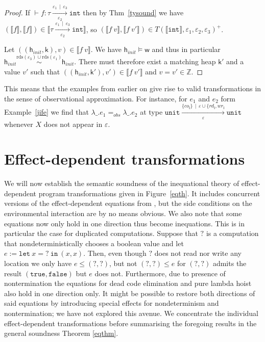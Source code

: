 \documentclass[nocopyrightspace,preprint]{sigplanconf}
\newcommand{\keywd}[1]{\mathtt{#1}}
\newcommand{\myeffto}[3]{\xrightarrow[#2]{#1\,\mid\, #3}}
\newcommand{\mnond}{\texttt{?}}
\newcommand{\mtrue}{\keywd{true}}
\newcommand{\mfalse}{\keywd{false}}
\newcommand{\inttype}{\keywd{int}}
\newcommand{\unittype}{\keywd{unit}}
\newcommand{\letin}[2]{\keywd{let}\:{#1}\!=\!{#2}\:\keywd{in}\:}
\newcommand{\rdsin}[1]{\mathrm{rds}({#1})}
\newcommand{\eff}{\varepsilon}
\newcommand{\sem}[1]{\ensuremath{\llbracket {#1} \rrbracket}}
\newcommand{\rEff}[1]{\ensuremath{\mathit{rd}_{#1}}}
\newcommand{\cEff}[1]{\ensuremath{\mathit{co}_{#1}}}
\newcommand{\wEff}[1]{\ensuremath{\mathit{wr}_{#1}}}
\newcommand{\loc}{\mathfrak{l}}
\newcommand{\cloc}{\ensuremath{X}\xspace}
\newcommand\w{\ensuremath{\mathsf{w}}\xspace}
\newcommand\hinit{\ensuremath{\mathsf{h}_{\mathit{init}}}\xspace}
\renewcommand\k{\ensuremath{\mathsf{k}}\xspace}
\newcommand\rloc[3]{\ensuremath{#1 \stackrel{#3}{\sim} #2}}
\begin{document}
\begin{proof}
If $\vdash f:\tau\myeffto{\eff_1}{\eff_2}{\eff_3}\inttype$ then by Thm~\ref{tysound} we have $(\sem{f},\sem{f})\in \sem{\tau\myeffto{\eff_1}{\eff_2}{\eff_3} \inttype}$, so 
$(\sem{f\ v},\sem{f\ v'})\in T(\sem{\inttype},\eff_1,\eff_2,\eff_3)^+$. 

Let $((\hinit,\k),v)\in \sem{f\ v}$. We have $\hinit\models\w$ and
thus in particular
$\rloc{\hinit}{\hinit}{\rdsin{\eff_3}\cup\rdsin{\eff_1}}$. There must
therefore exist a matching heap $\k'$ and a value $v'$ such that
$((\hinit,\k'),v')\in \sem{f\ v'}$ and $v=v'\in\mathbb{Z}$.
\end{proof}
This means that the examples from earlier on give rise to valid transformations in the sense of observational approximation. For instance, for $e_1$ and $e_2$ form Example~\ref{jife} we find that 
$\lambda \_.e_1 =_{\mathit{obs}}  \lambda\_.e_2$ at type $\unittype\myeffto{\{\cEff{\loc}\}}{\eff}{\eff \cup \{\rEff{\loc}, \wEff{\loc}}\unittype$ whenever $\cloc$ does not appear in $\eff$. 

\section{Effect-dependent transformations}
We will now establish the semantic soundness of the inequational
theory of effect-dependent program transformations given in
Figure~\ref{eqth}.  It includes concurrent versions of the
effect-dependent equations from \cite{DBLP:conf/aplas/BentonKHB06,DBLP:conf/icfp/ThamsborgB11},
but the side conditions on the environmental interaction are by no
means obvious. We also note that some equations now only hold in one
direction thus become inequations. This is in particular the case for
duplicated computations. Suppose that $\mnond{}$ is a computation that
nondeterministically chooses a boolean value and let
$e:=\letin{x}{\mnond{}}{(x,x)}$. Then, even though $\mnond{}$ does not read
nor write any location we only have $e\leq (\mnond{},\mnond{})$, but not
$(\mnond{},\mnond{})\leq e$ for $(\mnond{},\mnond{})$ admits the result
$(\mtrue,\mfalse)$ but $e$ does not. Furthermore, due to presence of
nontermination the equations for dead code elimination and pure lambda hoist also hold in one direction only. It might be possible to restore both directions of said equations by introducing special effects for nondeterminism and nontermination; we have not explored this avenue. We concentrate the individual effect-dependent transformations before
summarising the foregoing results in the general soundness Theorem
\ref{eqthm}. 
\end{document}
